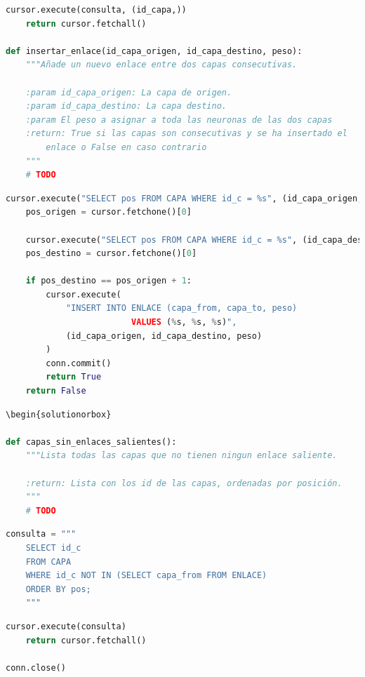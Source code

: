 \documentclass[
    12pt,
    a4paper,
    addpoints,
    answers,
    convocatoria=ord,
    titulacion=CD,
    curso=2024/2025,
]{db-exam}
\begin{document}
\begin{questions}
\begin{lstlisting}[language=Python]
    cursor.execute(consulta, (id_capa,))
    return cursor.fetchall()

def insertar_enlace(id_capa_origen, id_capa_destino, peso):
    """Añade un nuevo enlace entre dos capas consecutivas.
    
    :param id_capa_origen: La capa de origen.
    :param id_capa_destino: La capa destino.
    :param El peso a asignar a toda las neuronas de las dos capas
    :return: True si las capas son consecutivas y se ha insertado el
        enlace o False en caso contrario
    """
    # TODO
\end{lstlisting}

\begin{solutionorbox}
\begin{lstlisting}[language=Python]
    cursor.execute("SELECT pos FROM CAPA WHERE id_c = %s", (id_capa_origen,))
    pos_origen = cursor.fetchone()[0]

    cursor.execute("SELECT pos FROM CAPA WHERE id_c = %s", (id_capa_destino,))
    pos_destino = cursor.fetchone()[0]

    if pos_destino == pos_origen + 1:
        cursor.execute(
            "INSERT INTO ENLACE (capa_from, capa_to, peso)
                         VALUES (%s, %s, %s)",
            (id_capa_origen, id_capa_destino, peso)
        )
        conn.commit()
        return True
    return False
\end{lstlisting}
\end{solutionorbox}

\begin{lstlisting}[language=Python]
\begin{solutionorbox}

def capas_sin_enlaces_salientes():
    """Lista todas las capas que no tienen ningun enlace saliente.

    :return: Lista con los id de las capas, ordenadas por posición.
    """
    # TODO
\end{lstlisting}

\begin{solutionorbox}
\begin{lstlisting}[language=Python]
    consulta = """
    SELECT id_c
    FROM CAPA
    WHERE id_c NOT IN (SELECT capa_from FROM ENLACE)
    ORDER BY pos;
    """
\end{lstlisting}
\end{solutionorbox}

\begin{lstlisting}[language=Python]
    cursor.execute(consulta)
    return cursor.fetchall()

conn.close()
\end{lstlisting}



\end{questions}
\end{document}
